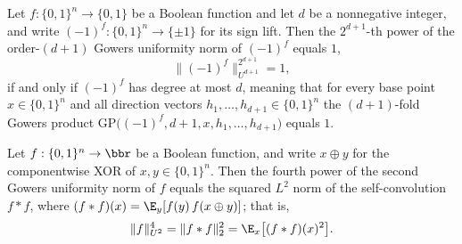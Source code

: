 \begin{lemma}
\label{LowDegreeTest.gowers_norm_eq_one_iff}
\leanok
{}
Let $f : \{0,1\}^n \to \{0,1\}$ be a Boolean function and let $d$ be a nonnegative
integer, and write $(-1)^f : \{0,1\}^n \to \{\pm 1\}$ for its sign lift. Then the
$2^{d+1}$-th power of the order-$(d+1)$ Gowers uniformity norm of $(-1)^f$ equals $1$,
\[
  \|(-1)^f\|_{U^{d+1}}^{2^{d+1}} = 1,
\]
if and only if $(-1)^f$ has degree at most $d$, meaning that for every base point $x \in
\{0,1\}^n$ and all direction vectors $h_1,\ldots,h_{d+1} \in \{0,1\}^n$ the $(d+1)$-fold
Gowers product $\mathrm{GP}\big((-1)^f, d{+}1, x, h_1,\ldots,h_{d+1}\big)$ equals $1$.
\end{lemma}

\begin{lemma}
\label{LowDegreeTest.gowers_U2_eq_L2_conv}
\leanok
{}
Let $f : \{0,1\}^n \to \bbr$ be a Boolean function, and write $x \oplus y$ for the
componentwise XOR of $x, y \in \{0,1\}^n$. Then the fourth power of the second Gowers
uniformity norm of $f$ equals the squared $L^2$ norm of the self-convolution $f * f$,
where $(f * f)(x) = \E_{y}[f(y)\,f(x \oplus y)]$; that is,
\[
  \|f\|_{U^2}^4 = \|f * f\|_2^2 = \E_{x}\bigl[(f * f)(x)^2\bigr].
\]
\end{lemma}

